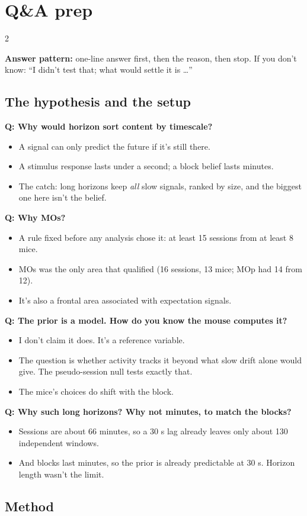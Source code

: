 \documentclass[10pt]{article}
\newcommand{\q}[2]{\par\smallskip\noindent\begin{minipage}{\linewidth}\raggedright{\bfseries\color{teal}Q: #1}\par\vspace{1pt}\begin{itemize}#2\end{itemize}\end{minipage}\par}
\begin{document}
\section*{Q\&A prep}\vspace{-2pt}
\begin{multicols}{2}\raggedright
\textbf{Answer pattern:} one-line answer first, then the reason, then stop. If you don't know: ``I didn't test that;
what would settle it is \ldots''

\subsection*{The hypothesis and the setup}

\q{Why would horizon sort content by timescale?}{
\item A signal can only predict the future if it's still there.
\item A stimulus response lasts under a second; a block belief lasts minutes.
\item The catch: long horizons keep \emph{all} slow signals, ranked by size, and the biggest one here isn't the
belief.}

\q{Why MOs?}{
\item A rule fixed before any analysis chose it: at least 15 sessions from at least 8 mice.
\item MOs was the only area that qualified (16 sessions, 13 mice; MOp had 14 from 12).
\item It's also a frontal area associated with expectation signals.}

\q{The prior is a model. How do you know the mouse computes it?}{
\item I don't claim it does. It's a reference variable.
\item The question is whether activity tracks it beyond what slow drift alone would give. The pseudo-session null tests
exactly that.
\item The mice's choices do shift with the block.}

\q{Why such long horizons? Why not minutes, to match the blocks?}{
\item Sessions are about 66 minutes, so a 30 s lag already leaves only about 130 independent windows.
\item And blocks last minutes, so the prior is already predictable at 30 s. Horizon length wasn't the limit.}

\subsection*{Method}


\end{multicols}
\end{document}
